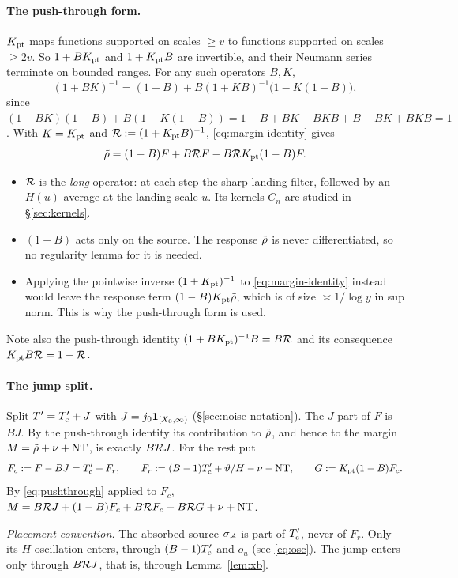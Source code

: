 \paragraph{The push-through form.} $K_{\mathrm{pt}}$ maps functions supported on scales $\ge v$ to functions supported on scales
$\ge2v$. So $1+BK_{\mathrm{pt}}$ and $1+K_{\mathrm{pt}} B$ are invertible, and their Neumann series terminate on bounded ranges. For any such
operators $B,K$,
\[
  (1+BK)^{-1}=(1-B)+B(1+KB)^{-1}\big(1-K(1-B)\big),
\]
since $(1+BK)(1-B)+B(1-K(1-B))=1-B+BK-BKB+B-BK+BKB=1$. With $K=K_{\mathrm{pt}}$ and $\mathcal{R}:=(1+K_{\mathrm{pt}} B)^{-1}$, \eqref{eq:margin-identity}
gives
\begin{equation}\label{eq:pushthrough}
  \tilde\rho=(1-B)F+B\mathcal{R} F-B\mathcal{R}K_{\mathrm{pt}}(1-B)F .
\end{equation}
\begin{itemize}
\item $\mathcal{R}$ is the \emph{long} operator: at each step the sharp landing filter, followed by an $H(u)$-average at the
  landing scale $u$. Its kernels $C_n$ are studied in \S\ref{sec:kernels}.
\item $(1-B)$ acts only on the source. The response $\tilde\rho$ is never differentiated, so no regularity lemma for it is needed.
\item Applying the pointwise inverse $(1+K_{\mathrm{pt}})^{-1}$ to \eqref{eq:margin-identity} instead would leave the response term
  $(1-B)K_{\mathrm{pt}}\tilde\rho$, which is of size $\asymp1/\log y$ in sup norm. This is why the push-through form is used.
\end{itemize}
Note also the push-through identity $(1+BK_{\mathrm{pt}})^{-1}B=B\mathcal{R}$ and its consequence $K_{\mathrm{pt}} B\mathcal{R}=1-\mathcal{R}$.

\paragraph{The jump split.} Split $T'=T'_{\mathrm{c}}+J$ with $J=j_0\mathbf 1_{[X_0,\infty)}$ (\S\ref{sec:noise-notation}). The
$J$-part of $F$ is $BJ$. By the push-through identity its contribution to $\tilde\rho$, and hence to the margin
$M=\tilde\rho+\nu+\mathrm{NT}$, is exactly $B\mathcal{R} J$. For the rest put
\begin{equation}\label{eq:decomp}
  F_c:=F-BJ=T'_{\mathrm{c}}+F_r,\qquad F_r:=(B-1)T'_{\mathrm{c}}+\vartheta/H-\nu-\mathrm{NT},\qquad G:=K_{\mathrm{pt}}(1-B)F_c .
\end{equation}
By \eqref{eq:pushthrough} applied to $F_c$,
$M=B\mathcal{R} J+(1-B)F_c+B\mathcal{R} F_c-B\mathcal{R} G+\nu+\mathrm{NT}$.

\emph{Placement convention.} The absorbed source $\sigma_{\mathcal{A}}$ is part of $T'_{\mathrm{c}}$, never of $F_r$. Only its
$H$-oscillation enters, through $(B-1)T'_{\mathrm{c}}$ and $o_u$ (see \eqref{eq:osc}). The jump enters only through $B\mathcal{R} J$, that is,
through Lemma~\ref{lem:xb}.
